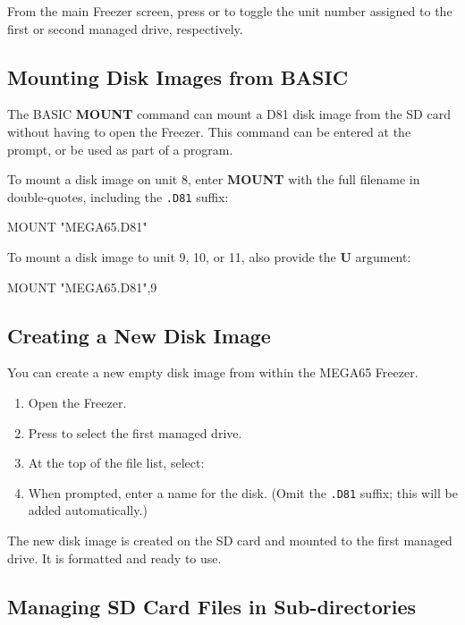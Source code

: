 From the main Freezer screen, press  or  to toggle the unit number assigned to the first or second managed drive, respectively.

\subsection{Mounting Disk Images from BASIC}

The BASIC {\bf MOUNT} command can mount a D81 disk image from the SD card without having to open the Freezer. This command can be entered at the  prompt, or be used as part of a program.

To mount a disk image on unit 8, enter {\bf MOUNT} with the full filename in double-quotes, including the {\tt .D81} suffix:

\begin{screenoutput}
MOUNT "MEGA65.D81"
\end{screenoutput}

To mount a disk image to unit 9, 10, or 11, also provide the {\bf U} argument:

\begin{screenoutput}
MOUNT "MEGA65.D81",9
\end{screenoutput}

\subsection{Creating a New Disk Image}

You can create a new empty disk image from within the MEGA65 Freezer.

\begin{enumerate}
\item Open the Freezer.
\item Press  to select the first managed drive.
\item At the top of the file list, select: 
\item When prompted, enter a name for the disk. (Omit the {\tt .D81} suffix; this will be added automatically.)
\end{enumerate}

The new disk image is created on the SD card and mounted to the first managed drive. It is formatted and ready to use.

\subsection{Managing SD Card Files in Sub-directories}

